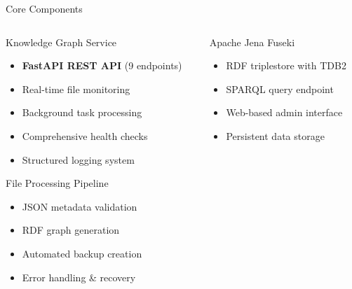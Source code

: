 \documentclass[aspectratio=169]{beamer}
\begin{document}
\begin{frame}{Core Components}
    \begin{columns}[c]
        \begin{column}{0.5\textwidth}
            \begin{block}{Knowledge Graph Service}
                \begin{itemize}
                    \item \textbf{FastAPI REST API} (9 endpoints)
                    \item Real-time file monitoring
                    \item Background task processing
                    \item Comprehensive health checks
                    \item Structured logging system
                \end{itemize}
            \end{block}
            
            \begin{block}{File Processing Pipeline}
                \begin{itemize}
                    \item JSON metadata validation
                    \item RDF graph generation
                    \item Automated backup creation
                    \item Error handling \& recovery
                \end{itemize}
            \end{block}
        \end{column}
        \begin{column}{0.5\textwidth}
            \begin{block}{Apache Jena Fuseki}
                \begin{itemize}
                    \item RDF triplestore with TDB2
                    \item SPARQL query endpoint
                    \item Web-based admin interface
                    \item Persistent data storage
                \end{itemize}
            \end{block}
            

\end{column}
\end{columns}
\end{frame}
\end{document}
